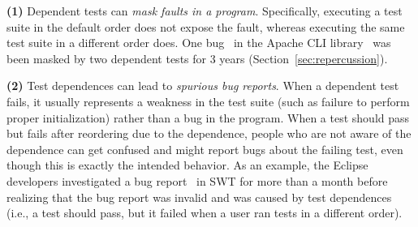 \textbf{(1)}
Dependent tests can
\emph{mask faults in a program}. Specifically, executing a test suite in the
default order does not expose the fault, whereas
executing the same test suite in a different order does. 
One bug~\cite{clibug} in the Apache CLI library~\cite{cli}
was been masked by two dependent tests
for 3 years (Section~\ref{sec:repercussion}).

\textbf{(2)}
Test dependences can lead to \emph{spurious bug reports}.
When a dependent test fails, it usually represents
a weakness in the test
suite (such as failure to perform proper initialization) rather than a bug
in the program. 
When a test should pass but
fails after reordering due to the dependence,
people who are not aware of the dependence can get confused
and might report bugs about the failing test,
even though this is exactly the intended behavior.
%
As an example, the Eclipse developers
investigated a bug report~\cite{eclipsebug} in SWT for
more than a month before realizing that the 
bug report was invalid and was caused by test dependences
(i.e., a test should pass, but it failed when a user
ran tests in a different order).
%



